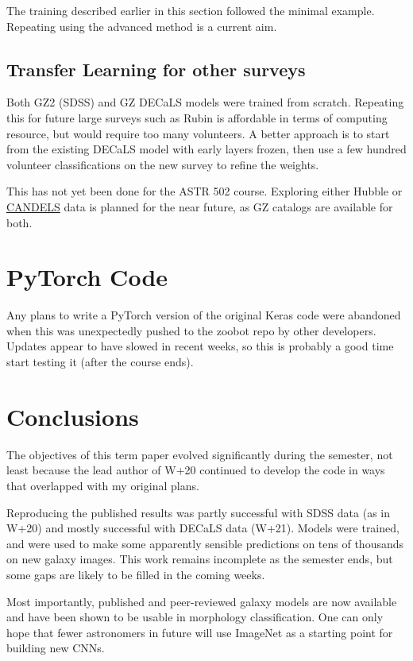 \documentclass[preprint]{aastex631}
\begin{document}
The training described earlier in this section followed the minimal example. Repeating using the advanced method is a current aim.

\subsection{Transfer Learning for other surveys}

Both GZ2 (SDSS) and GZ DECaLS models were trained from scratch. Repeating this for future large surveys such as Rubin is affordable in terms of computing resource, but would require too many volunteers. A better approach is to start from the existing DECaLS model with early layers frozen, then use a few hundred volunteer classifications on the new survey to refine the weights.

This has not yet been done for the ASTR 502 course. Exploring either Hubble or \href{http://candels.ucolick.org/}{CANDELS} data is planned for the near future, as GZ catalogs are available for both.


\section{PyTorch Code}

Any plans to write a PyTorch version of the original Keras code were abandoned when this was unexpectedly pushed to the zoobot repo by other developers. Updates appear to have slowed in recent weeks, so this is probably a good time start testing it (after the course ends).  

\section{Conclusions}

The objectives of this term paper evolved significantly during the semester, not least because the lead author of W+20 continued to develop the code in ways that overlapped with my original plans.

Reproducing the published results was partly successful with SDSS data (as in W+20) and mostly successful with DECaLS data (W+21). Models were trained, and were used to make some apparently sensible predictions on tens of thousands on new galaxy images. This work remains incomplete as the semester ends, but some gaps are likely to be filled in the coming weeks.

Most importantly, published and peer-reviewed galaxy models are now available and have been shown to be usable in morphology classification. One can only hope that fewer astronomers in future will use ImageNet as a starting point for building new CNNs. 


{}

\end{document}
